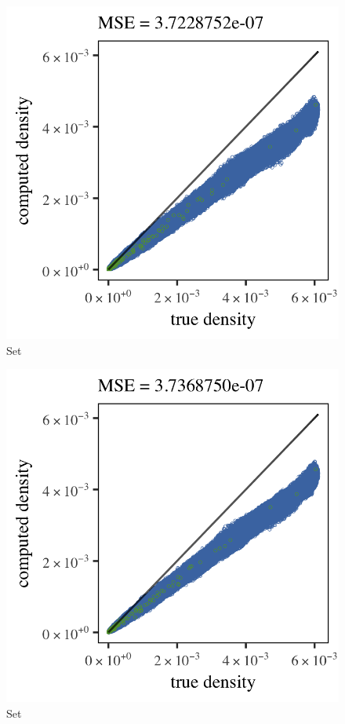 \begin{subfigure}{0.3\textwidth}
	\centering
	\includegraphics[keepaspectratio=true, width=\textwidth, height=0.23\textheight]{4/img/results_baakman_4_600000_parzen}
	\caption{Set \baakmanFour}
	\label{fig:4:simulated:datasets:parzen:baakman4}
\end{subfigure}	
\begin{subfigure}{0.3\textwidth}
	\centering
	\includegraphics[keepaspectratio=true, width=\textwidth, height=0.23\textheight]{4/img/results_baakman_5_600000_parzen}
	\caption{Set \baakmanFive}
	\label{fig:4:simulated:datasets:parzen:baakman5}
\end{subfigure}		
